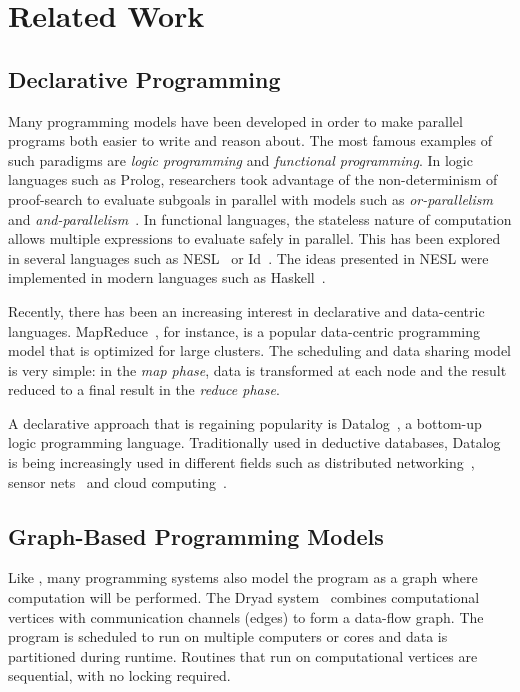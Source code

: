 \section{Related Work}

\subsection{Declarative Programming}

Many programming models have been developed in order to make parallel programs both easier to write and reason about. The most famous examples of such paradigms are \emph{logic programming} and \emph{functional programming}.
In logic languages such as Prolog, researchers took advantage of the non-determinism of proof-search to evaluate subgoals
in parallel with models such as \emph{or-parallelism}~\cite{ali-86} and \emph{and-parallelism}~\cite{Shen-92}.
In functional languages, the stateless nature of computation allows multiple expressions to evaluate safely in parallel.
This has been explored in several languages such as NESL~\cite{Blelloch:1996:PPA:227234.227246} or Id~\cite{Nikhil93anoverview}. The ideas presented in NESL were implemented in modern languages such as Haskell~\cite{Chakravarty07dataparallel}.

Recently, there has been an increasing interest in declarative and data-centric languages.
MapReduce~\cite{Dean:2008:MSD:1327452.1327492}, for instance, is a popular data-centric programming
model that is optimized for large clusters. The scheduling and data sharing model is very simple:
in the \emph{map phase}, data is transformed at each node and the result reduced to a final
result in the \emph{reduce phase}.

A declarative approach that is regaining popularity is Datalog~\cite{Ullman:1990:PDK:533142}, a
bottom-up logic programming language.
Traditionally used in deductive databases, Datalog is being increasingly used in different fields
such as distributed networking~\cite{Loo-condie-garofalakis-p2}, sensor
nets~\cite{Chu:2007:DID:1322263.1322281} and cloud computing~\cite{alvaro:boom}.

\subsection{Graph-Based Programming Models}

Like \lang, many programming systems also model the program as a graph where computation will be performed.
The Dryad system~\cite{Isard:2007:DDD:1272996.1273005} combines computational vertices
with communication channels (edges) to form a data-flow graph. The program is scheduled to
run on multiple computers or cores and data is partitioned during runtime. Routines that run on computational vertices
are sequential, with no locking required.

